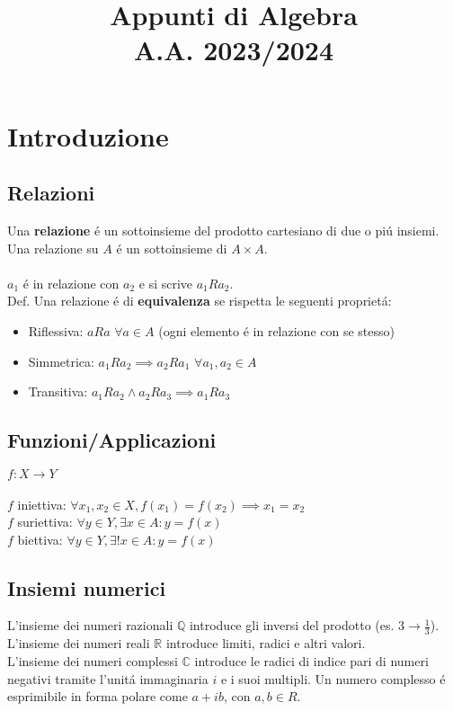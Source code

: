 \documentclass{article}
\title{
	Appunti di Algebra \\
	\large A.A. 2023/2024
}
\date{}
\begin{document}
\maketitle

\section{Introduzione}

\subsection{Relazioni}
Una \textbf{relazione} é un sottoinsieme del prodotto cartesiano di due o piú insiemi.\\
Una relazione su $A$ é un sottoinsieme di $A \times A$. \\\\
$a_{1}$ é in relazione con $a_{2}$ e si scrive $a_{1} R a_{2}$. \\
Def. Una relazione é di \textbf{equivalenza} se rispetta le seguenti proprietá:
\begin{itemize}
	\item[] Riflessiva: $a R a$ $\forall a \in A$ (ogni elemento é in relazione con se stesso)
	\item[] Simmetrica: $a_{1} R a_{2} \implies a_{2} R a_{1}$ $\forall a_{1}, a_{2} \in A$
	\item[] Transitiva: $a_1 R a_2 \wedge a_2 R a_3 \implies a_1 R a_3$
\end{itemize}

\subsection{Funzioni/Applicazioni}
$f : X \rightarrow Y$\\\\
$f$ iniettiva: $\forall x_1, x_2 \in X, f(x_1) = f(x_2) \implies x_1=x_2$ \\
$f$ suriettiva: $\forall y \in Y, \exists x \in A : y = f(x)$ \\
$f$ biettiva: $\forall y \in Y, \exists! x \in A : y = f(x)$

\subsection{Insiemi numerici}
L'insieme dei numeri razionali $\mathbb{Q}$ introduce gli inversi del prodotto (es. $3 \rightarrow \frac{1}{3}$). \\
L'insieme dei numeri reali $\mathbb{R}$ introduce limiti, radici e altri valori. \\
L'insieme dei numeri complessi $\mathbb{C}$ introduce le radici di indice pari di numeri negativi tramite l'unitá immaginaria $i$ e i suoi multipli. Un numero complesso é esprimibile in forma polare come $a+ib$, con $a,b \in R$.
\end{document}
